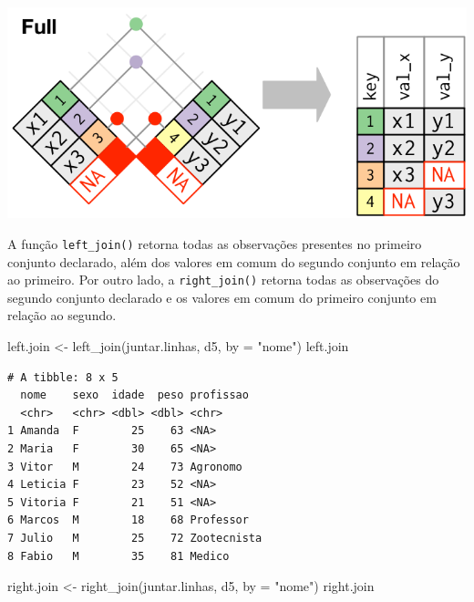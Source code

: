 \documentclass[
  brazilian,
]{book}
\newenvironment{Shaded}{\begin{snugshade}}{\end{snugshade}}
\newcommand{\AttributeTok}[1]{\textcolor[rgb]{0.77,0.63,0.00}{#1}}
\newcommand{\FunctionTok}[1]{\textcolor[rgb]{0.00,0.00,0.00}{#1}}
\newcommand{\NormalTok}[1]{#1}
\newcommand{\OtherTok}[1]{\textcolor[rgb]{0.56,0.35,0.01}{#1}}
\newcommand{\StringTok}[1]{\textcolor[rgb]{0.31,0.60,0.02}{#1}}
\let\origfigure\figure
\let\endorigfigure\endfigure
\renewenvironment{figure}[1][2] {
    \expandafter\origfigure\expandafter[H]
} {
    \endorigfigure
}
\begin{document}
\begin{figure}

{\centering \includegraphics[width=0.5\linewidth]{imagens/join-full} 

}

\caption{Esquematização da função full-join. Fonte: R for Data Science, 2017.}\label{fig:unnamed-chunk-175}
\end{figure}

A função \texttt{left\_join()} retorna todas as observações presentes no primeiro conjunto declarado, além dos valores em comum do segundo conjunto em relação ao primeiro. Por outro lado, a \texttt{right\_join()} retorna todas as observações do segundo conjunto declarado e os valores em comum do primeiro conjunto em relação ao segundo.

\begin{Shaded}
\begin{Highlighting}[]
\NormalTok{left.join }\OtherTok{\textless{}{-}} \FunctionTok{left\_join}\NormalTok{(juntar.linhas, d5, }\AttributeTok{by =} \StringTok{"nome"}\NormalTok{)}
\NormalTok{left.join}
\end{Highlighting}
\end{Shaded}

\begin{verbatim}
# A tibble: 8 x 5
  nome    sexo  idade  peso profissao  
  <chr>   <chr> <dbl> <dbl> <chr>      
1 Amanda  F        25    63 <NA>       
2 Maria   F        30    65 <NA>       
3 Vitor   M        24    73 Agronomo   
4 Leticia F        23    52 <NA>       
5 Vitoria F        21    51 <NA>       
6 Marcos  M        18    68 Professor  
7 Julio   M        25    72 Zootecnista
8 Fabio   M        35    81 Medico     
\end{verbatim}

\begin{Shaded}
\begin{Highlighting}[]
\NormalTok{right.join }\OtherTok{\textless{}{-}} \FunctionTok{right\_join}\NormalTok{(juntar.linhas, d5, }\AttributeTok{by =} \StringTok{"nome"}\NormalTok{)}
\NormalTok{right.join}
\end{Highlighting}
\end{Shaded}
\end{document}
